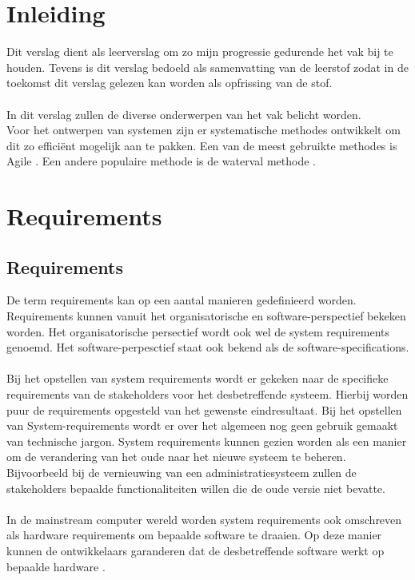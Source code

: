 \section{Inleiding}
Dit verslag dient als leerverslag om zo mijn progressie gedurende het vak bij te houden. Tevens is dit verslag bedoeld als samenvatting van de leerstof zodat in de toekomst dit verslag gelezen kan worden als opfrissing van de stof.\\\\
In dit verslag zullen de diverse onderwerpen van het vak belicht worden.\\ 
Voor het ontwerpen van systemen zijn er systematische methodes ontwikkelt om dit zo efficiënt mogelijk aan te pakken. Een van de meest gebruikte methodes is Agile \cite{manifesto2001manifesto}. Een andere populaire methode is de waterval methode \cite{boehm1988spiral}.  \newpage

\section{Requirements}
\subsection{Requirements}
De term requirements kan op een aantal manieren gedefinieerd worden.\\ Requirements kunnen vanuit het organisatorische en software-perspectief bekeken worden. Het organisatorische persectief wordt ook wel de system requirements genoemd. Het software-perpesctief staat ook bekend als de software-specifications. \\ \\ Bij het opstellen van system requirements wordt er gekeken naar de specifieke requirements van de stakeholders voor het desbetreffende systeem. Hierbij worden puur de requirements opgesteld van het gewenste eindresultaat. Bij het opstellen van System-requirements wordt er over het algemeen nog geen gebruik gemaakt van technische jargon. System requirements kunnen gezien worden als een manier om de verandering van het oude naar het nieuwe systeem te beheren. Bijvoorbeeld bij de vernieuwing van een administratiesysteem zullen de stakeholders bepaalde functionaliteiten willen die de oude versie niet bevatte. \cite{loucopoulos1995system}
\\\\
In de mainstream computer wereld worden system requirements ook omschreven als hardware requirements om bepaalde software te draaien. Op deze manier kunnen de ontwikkelaars garanderen dat de desbetreffende software werkt op bepaalde hardware \cite{systemrequirementsWiki}.
